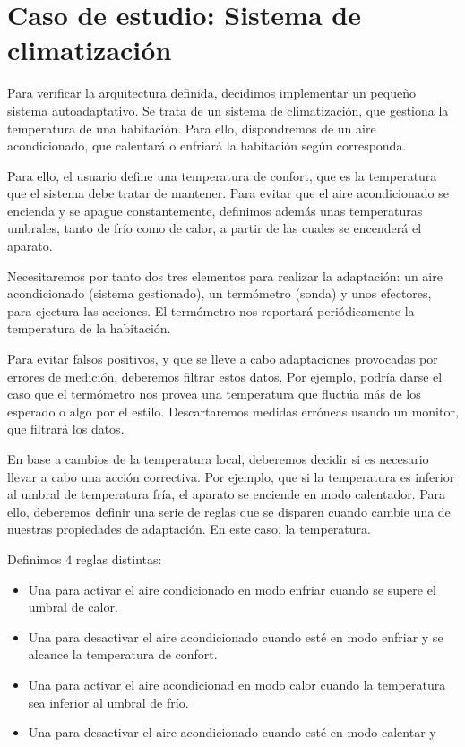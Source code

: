 \chapter{Caso de estudio: Sistema de climatización}
\label{chap:caso_estudio}

Para verificar la arquitectura definida, decidimos implementar un pequeño sistema autoadaptativo. Se trata de un sistema de climatización, que gestiona la temperatura de una habitación. Para ello, dispondremos de un aire acondicionado, que calentará o enfriará la habitación según corresponda.

Para ello, el usuario define una temperatura de confort, que es la temperatura que el sistema debe tratar de mantener. Para evitar que el aire acondicionado se encienda y se apague constantemente, definimos además unas temperaturas umbrales, tanto de frío como de calor, a partir de las cuales se encenderá el aparato.

Necesitaremos por tanto dos tres elementos para realizar la adaptación: un aire acondicionado (sistema gestionado), un termómetro (sonda) y unos efectores, para ejectura las acciones. El termómetro nos reportará periódicamente la temperatura de la habitación.

Para evitar falsos positivos, y que se lleve a cabo adaptaciones provocadas por errores de medición, deberemos filtrar estos datos. Por ejemplo, podría darse el caso que el termómetro nos provea una temperatura que fluctúa más de los esperado o algo por el estilo. Descartaremos medidas erróneas usando un monitor, que filtrará los datos.

En base a cambios de la temperatura local, deberemos decidir si es necesario llevar a cabo una acción correctiva. Por ejemplo, que si la temperatura es inferior al umbral de temperatura fría, el aparato se enciende en modo calentador. Para ello, deberemos definir una serie de reglas que se disparen cuando cambie una de nuestras propiedades de adaptación. En este caso, la temperatura.

Definimos 4 reglas distintas:
\begin{itemize}
  \item Una para activar el aire condicionado en modo enfriar cuando se supere el umbral de calor.
  \item Una para desactivar el aire acondicionado cuando esté en modo enfriar y se alcance la temperatura de confort.
  \item Una para activar el aire acondicionad en modo calor cuando la temperatura sea inferior al umbral de frío.
  \item Una para desactivar el aire acondicionado cuando esté en modo calentar y
\end{itemize}

